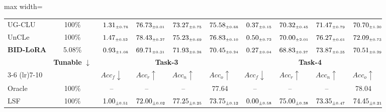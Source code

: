 \begin{table}[!htbp]
\begin{adjustbox}{max width=\textwidth}
\begin{tabular}{l|c|cccc|cccc}
UG-CLU & 100\% & $\kern6pt1.31_{\scriptscriptstyle \pm 0.78}\kern-6pt$ & \colorbox{yellow!35}{$\kern6pt76.73_{\scriptscriptstyle \pm 0.01}\kern-6pt$} & $\kern6pt73.27_{\scriptscriptstyle \pm 0.75}\kern-6pt$ & \colorbox{yellow!35}{$\kern6pt75.58_{\scriptscriptstyle \pm 0.88}\kern-6pt$} & $\kern6pt0.37_{\scriptscriptstyle \pm 0.15}\kern-6pt$ & \colorbox{green!25}{$\kern6pt70.32_{\scriptscriptstyle \pm 0.45}\kern-6pt$} & $\kern6pt71.47_{\scriptscriptstyle \pm 0.79}\kern-6pt$ & $\kern6pt70.70_{\scriptscriptstyle \pm 1.20}\kern-6pt$ \\
UnCLe & 100\% & $\kern6pt1.47_{\scriptscriptstyle \pm 0.52}\kern-6pt$ & \colorbox{green!25}{$\kern6pt78.43_{\scriptscriptstyle \pm 0.27}\kern-6pt$} & $\kern6pt75.23_{\scriptscriptstyle \pm 0.69}\kern-6pt$ & \colorbox{green!25}{$\kern6pt76.83_{\scriptscriptstyle \pm 0.10}\kern-6pt$} & $\kern6pt0.50_{\scriptscriptstyle \pm 0.72}\kern-6pt$ & $\kern6pt70.00_{\scriptscriptstyle \pm 2.01}\kern-6pt$ & \colorbox{yellow!35}{$\kern6pt76.27_{\scriptscriptstyle \pm 0.61}\kern-6pt$} & \colorbox{yellow!35}{$\kern6pt72.09_{\scriptscriptstyle \pm 0.73}\kern-6pt$} \\
\midrule
\rowcolor{pink!15}
\textbf{BID-LoRA} & 5.08\% & $\kern6pt0.93_{\scriptscriptstyle \pm 1.08}\kern-6pt$ & $\kern6pt69.71_{\scriptscriptstyle \pm 0.31}\kern-6pt$ & $\kern6pt71.93_{\scriptscriptstyle \pm 0.28}\kern-6pt$ & $\kern6pt70.45_{\scriptscriptstyle \pm 0.24}\kern-6pt$ & $\kern6pt0.27_{\scriptscriptstyle \pm 0.04}\kern-6pt$ & $\kern6pt68.83_{\scriptscriptstyle \pm 0.27}\kern-6pt$ & $\kern6pt73.87_{\scriptscriptstyle \pm 0.35}\kern-6pt$ & $\kern6pt70.51_{\scriptscriptstyle \pm 0.29}\kern-6pt$ \\
\midrule
\addlinespace[0.05cm]
\midrule
\multirow{2}{*}{\textbf{Method}} & \multirow{2}{*}{\textbf{Tunable} $\downarrow$}
& \multicolumn{4}{c|}{\textbf{Task-3}} & \multicolumn{4}{c}{\textbf{Task-4}} \\
\cmidrule(lr){3-6} \cmidrule(lr){7-10}
& & $Acc_f \downarrow$ & $Acc_r \uparrow$ & $Acc_n \uparrow$ & $Acc_o \uparrow$
& $Acc_f \downarrow$ & $Acc_r \uparrow$ & $Acc_n \uparrow$ & $Acc_o \uparrow$ \\
\midrule
Oracle        & 100\% & -- & -- & -- & 77.64 & -- & -- & -- & 78.04 \\
\midrule
LSF & 100\% & $\kern6pt1.00_{\scriptscriptstyle \pm 0.51}\kern-6pt$ & \colorbox{yellow!35}{$\kern6pt72.00_{\scriptscriptstyle \pm 0.02}\kern-6pt$} & $\kern6pt77.25_{\scriptscriptstyle \pm 0.25}\kern-6pt$ & $\kern6pt73.75_{\scriptscriptstyle \pm 0.12}\kern-6pt$ & $\kern6pt0.00_{\scriptscriptstyle \pm 0.58}\kern-6pt$ & \colorbox{yellow!35}{$\kern6pt75.00_{\scriptscriptstyle \pm 0.38}\kern-6pt$} & $\kern6pt73.35_{\scriptscriptstyle \pm 0.47}\kern-6pt$ & \colorbox{yellow!35}{$\kern6pt74.45_{\scriptscriptstyle \pm 0.21}\kern-6pt$} \\

\end{tabular}
\end{adjustbox}
\end{table}
